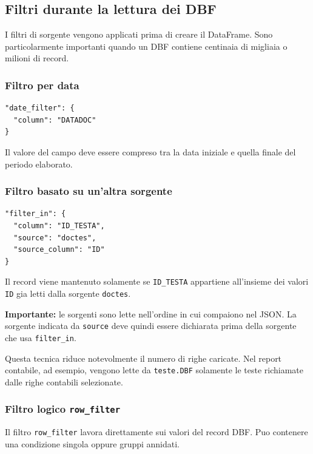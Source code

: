 \subsection{Filtri durante la lettura dei DBF}

I filtri di sorgente vengono applicati prima di creare il DataFrame. Sono
particolarmente importanti quando un DBF contiene centinaia di migliaia o
milioni di record.

\subsubsection{Filtro per data}

\begin{lstlisting}
"date_filter": {
  "column": "DATADOC"
}
\end{lstlisting}

Il valore del campo deve essere compreso tra la data iniziale e quella finale
del periodo elaborato.

\subsubsection{Filtro basato su un'altra sorgente}

\begin{lstlisting}
"filter_in": {
  "column": "ID_TESTA",
  "source": "doctes",
  "source_column": "ID"
}
\end{lstlisting}

Il record viene mantenuto solamente se \texttt{ID\_TESTA} appartiene
all'insieme dei valori \texttt{ID} gia letti dalla sorgente \texttt{doctes}.

\textbf{Importante:} le sorgenti sono lette nell'ordine in cui compaiono nel
JSON. La sorgente indicata da \texttt{source} deve quindi essere dichiarata
prima della sorgente che usa \texttt{filter\_in}.

Questa tecnica riduce notevolmente il numero di righe caricate. Nel report
contabile, ad esempio, vengono lette da \texttt{teste.DBF} solamente le teste
richiamate dalle righe contabili selezionate.

\subsubsection{Filtro logico \texttt{row\_filter}}

Il filtro \texttt{row\_filter} lavora direttamente sui valori del record DBF.
Puo contenere una condizione singola oppure gruppi annidati.

